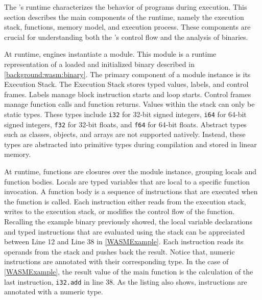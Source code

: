 \label{background:wasm:execution}

The \Wasm's runtime characterizes the behavior of \Wasm programs during execution. 
This section describes the main components of the \Wasm runtime, namely the execution stack, functions, memory model, and execution process. 
These components are crucial for understanding both the \Wasm's control flow and the analysis of \Wasm binaries.


 At runtime, \Wasm engines instantiate a \Wasm module. 
This module is a runtime representation of a loaded and initialized \Wasm binary described in \autoref{background:wasm:binary}. 
The primary component of a module instance is its Execution Stack. 
The Execution Stack stores typed values, labels, and control frames. 
Labels manage block instruction starts and loop starts.
Control frames manage function calls and function returns.
Values within the stack can only be static types.
These types include \texttt{i32} for 32-bit signed integers, \texttt{i64} for 64-bit signed integers, \texttt{f32} for 32-bit floats, and \texttt{f64} for 64-bit floats. 
Abstract types such as classes, objects, and arrays are not supported natively. 
Instead, these types are abstracted into primitive types during compilation and stored in linear memory.


 At runtime, \Wasm functions are closures over the module instance, grouping locals and function bodies.
Locals are typed variables that are local to a specific function invocation.
A function body is a sequence of instructions that are executed when the function is called.
Each instruction either reads from the execution stack, writes to the execution stack, or modifies the control flow of the function.
Recalling the example \Wasm binary previously showed, the local variable declarations and typed instructions that are evaluated using the stack can be appreciated between Line 12 and Line 38 in \autoref{WASMExample}. 
Each instruction reads its operands from the stack and pushes back the result. 
Notice that, numeric instructions are annotated with their corresponding type.
In the case of \autoref{WASMExample}, the result value of the main function is the calculation of the last instruction, \texttt{i32.add} in line 38. 
As the listing also shows, instructions are annotated with a numeric type.


